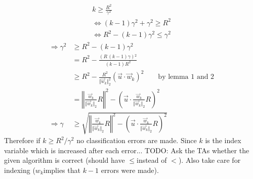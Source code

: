 \[
\begin{gathered}k\geq\frac{R^{2}}{\gamma^{2}}\\
\Leftrightarrow(k-1)\gamma^{2}+\gamma^{2}\geq R^{2}\\
\Leftrightarrow R^{2}-(k-1)\gamma^{2}\leq\gamma^{2}
\end{gathered}
\]
\begin{align*}
\Rightarrow\gamma^{2} & \geq R^{2}-(k-1)\gamma^{2}\\
 & =R^{2}-\frac{\left(R\,\left(k-1\right)\gamma\right){}^{2}}{\left(k-1\right)R^{2}}\\
 & \geq R^{2}-\frac{R^{2}}{\Vert\vec{w}_{k}\Vert_{2}^{2}}\left(\vec{u}\cdot\vec{w}_{k}\right)^{2}\qquad\text{by lemma 1 and 2}\\
 & =\left\Vert \frac{\vec{w}_{k}}{\Vert\vec{w}_{k}\Vert_{2}}R\right\Vert ^{2}-\left(\vec{u}\cdot\frac{\vec{w}_{k}}{\Vert\vec{w}_{k}\Vert_{2}}R\right)^{2}\\
\Rightarrow\gamma & \geq\sqrt{\left\Vert \frac{\vec{w}_{k}}{\Vert\vec{w}_{k}\Vert_{2}}R\right\Vert ^{2}-\left(\vec{u}\cdot\frac{\vec{w}_{k}}{\Vert\vec{w}_{k}\Vert_{2}}R\right)^{2}}
\end{align*}
Therefore if $k\geq R^{2}/\gamma^{2}$ no classification errors are
made. Since $k$ is the index variable which is increased after each
error... TODO: Ask the TAs whether the given algorithm is correct
(should have $\leq$instead of $<$). Also take care for indexing
($w_{k}$implies that $k-1$ errors were made).